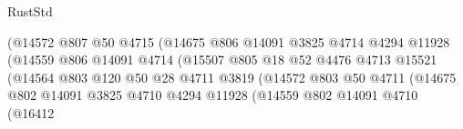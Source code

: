 \begin{lexlean}{RustStd}
\begin{coremodule}
                                            (@14572
                                              @807
                                              @50
                                              @4715
                                              (@14675
                                                @806
                                                @14091
                                                @3825
                                                @4714
                                                @4294
                                                @11928
                                                (@14559
                                                  @806
                                                  @14091
                                                  @4714
                                                  (@15507
                                                    @805
                                                    @18
                                                    @52
                                                    @4476
                                                    @4713
                                                    @15521
                                                    (@14564
                                                      @803
                                                      @120
                                                      @50
                                                      @28
                                                      @4711
                                                      @3819
                                                      (@14572
                                                        @803
                                                        @50
                                                        @4711
                                                        (@14675
                                                          @802
                                                          @14091
                                                          @3825
                                                          @4710
                                                          @4294
                                                          @11928
                                                          (@14559
                                                            @802
                                                            @14091
                                                            @4710
                                                            (@16412

\end{coremodule}
\end{lexlean}
